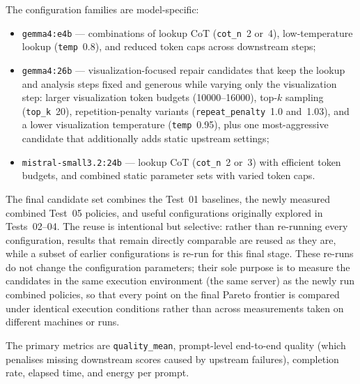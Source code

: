 The configuration families are model-specific:

\begin{itemize}
    \item \texttt{gemma4:e4b} --- combinations of lookup CoT
          (\texttt{cot\_n}~2 or~4), low-temperature lookup
          (\texttt{temp}~0.8), and reduced token caps across downstream
          steps;
    \item \texttt{gemma4:26b} --- visualization-focused repair candidates
          that keep the lookup and analysis steps fixed and generous while
          varying only the visualization step: larger visualization token
          budgets (10000--16000), top-$k$ sampling (\texttt{top\_k}~20),
          repetition-penalty variants (\texttt{repeat\_penalty}~1.0 and~1.03),
          and a lower visualization temperature (\texttt{temp}~0.95), plus one
          most-aggressive candidate that additionally adds static upstream
          settings;
    \item \texttt{mistral-small3.2:24b} --- lookup CoT (\texttt{cot\_n}~2
          or~3) with efficient token budgets, and combined static parameter
          sets with varied token caps.
\end{itemize}

The final candidate set combines the Test~01 baselines, the newly measured
combined Test~05 policies, and useful configurations originally explored in
Tests~02--04. The reuse is intentional but selective: rather than re-running
every configuration, results that remain directly comparable are reused as
they are, while a subset of earlier configurations is re-run for this final
stage. These re-runs do not change the configuration parameters; their sole
purpose is to measure the candidates in the same execution environment (the
same server) as the newly run combined policies, so that every point on the
final Pareto frontier is compared under identical execution conditions rather
than across measurements taken on different machines or runs.

The primary metrics are \texttt{quality\_mean}, prompt-level end-to-end
quality (which penalises missing downstream scores caused by upstream
failures), completion rate, elapsed time, and energy per prompt.

